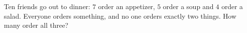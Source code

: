 Ten friends go out to dinner: $7$ order an appetizer, $5$ order a soup and $4$ order a salad. Everyone orders something, and no one orders exactly two things. How many order all three?
